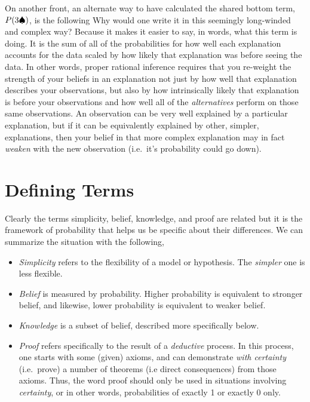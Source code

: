 \documentclass{tufte-book}
\begin{document}
On another front, an alternate way to have calculated the shared bottom
term, \(P(3\spadesuit)\), is the following Why would one write it in this
seemingly long-winded and complex way? Because it makes it easier to
say, in words, what this term is doing. It is the sum of all of the
probabilities for how well each explanation accounts for the data scaled
by how likely that explanation was before seeing the data. In other
words, proper rational inference requires that you re-weight the
strength of your beliefs in an explanation not just by how well that
explanation describes your observations, but also by how intrinsically
likely that explanation is before your observations and how well all of
the \emph{alternatives} perform on those same observations. An
observation can be very well explained by a particular explanation, but
if it can be equivalently explained by other, simpler, explanations,
then your belief in that more complex explanation may in fact
\emph{weaken} with the new observation (i.e.~it's probability could go
down).

\section{Defining Terms}\label{defining-terms}

Clearly the terms simplicity, belief, knowledge, and proof are related
but it is the framework of probability that helps us be specific about
their differences. We can summarize the situation with the following,

\begin{itemize}
\itemsep1pt\parskip0pt
\item
  \emph{Simplicity} refers to the flexibility of a model or hypothesis.
  The \emph{simpler} one is less flexible.
\item
  \emph{Belief} is measured by probability. Higher probability is
  equivalent to stronger belief, and likewise, lower probability is
  equivalent to weaker belief.
\item
  \emph{Knowledge} is a subset of belief, described more specifically
  below.
\item
  \emph{Proof} refers specifically to the result of a \emph{deductive}
  process. In this process, one starts with some (given) axioms, and can
  demonstrate \emph{with certainty} (i.e.~prove) a number of theorems
  (i.e direct consequences) from those axioms. Thus, the word proof
  should only be used in situations involving \emph{certainty}, or in
  other words, probabilities of exactly 1 or exactly 0 only.
\end{itemize}
\end{document}
